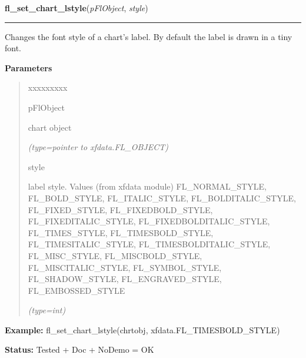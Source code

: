 \hspace{.8\funcindent}\begin{boxedminipage}{\funcwidth}

    \raggedright \textbf{fl\_set\_chart\_lstyle}(\textit{pFlObject}, \textit{style})

    \vspace{-1.5ex}

    \rule{\textwidth}{0.5\fboxrule}
\setlength{\parskip}{2ex}
    Changes the font style of a chart's label. By default the label is 
    drawn in a tiny font.

\setlength{\parskip}{1ex}
      \textbf{Parameters}
      \vspace{-1ex}

      \begin{quote}
        \begin{Ventry}{xxxxxxxxx}

          \item[pFlObject]

          chart object

            {\it (type=pointer to xfdata.FL\_OBJECT)}

          \item[style]

          label style. Values (from xfdata module) FL\_NORMAL\_STYLE, 
          FL\_BOLD\_STYLE, FL\_ITALIC\_STYLE, FL\_BOLDITALIC\_STYLE, 
          FL\_FIXED\_STYLE, FL\_FIXEDBOLD\_STYLE, FL\_FIXEDITALIC\_STYLE, 
          FL\_FIXEDBOLDITALIC\_STYLE, FL\_TIMES\_STYLE, 
          FL\_TIMESBOLD\_STYLE, FL\_TIMESITALIC\_STYLE, 
          FL\_TIMESBOLDITALIC\_STYLE, FL\_MISC\_STYLE, FL\_MISCBOLD\_STYLE,
          FL\_MISCITALIC\_STYLE, FL\_SYMBOL\_STYLE, FL\_SHADOW\_STYLE, 
          FL\_ENGRAVED\_STYLE, FL\_EMBOSSED\_STYLE

            {\it (type=int)}

        \end{Ventry}

      \end{quote}

\textbf{Example:} fl\_set\_chart\_lstyle(chrtobj, xfdata.FL\_TIMESBOLD\_STYLE)



\textbf{Status:} Tested + Doc + NoDemo = OK



    \end{boxedminipage}

    \label{xformslib:flchart:fl_set_chart_lsize}

